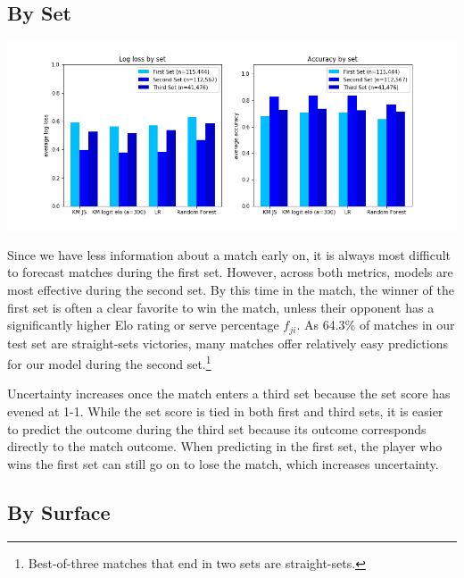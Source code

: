 \documentclass[chapterprefix=false]{report}
\begin{document}
\subsection{By Set}


\hspace*{-1.5cm}\includegraphics[scale=.6]{set_performance3}

Since we have less information about a match early on, it is always most difficult to forecast matches during the first set. However, across both metrics, models are most effective during the second set. By this time in the match, the winner of the first set is often a clear favorite to win the match, unless their opponent has a significantly higher Elo rating or serve percentage $f_{ji}$. As 64.3\% of matches in our test set are straight-sets victories, many matches offer relatively easy predictions for our model during the second set.\footnote{Best-of-three matches that end in two sets are straight-sets.}

Uncertainty increases once the match enters a third set because the set score has evened at 1-1. While the set score is tied in both first and third sets, it is easier to predict the outcome during the third set because its outcome corresponds directly to the match outcome. When predicting in the first set, the player who wins the first set can still go on to lose the match, which increases uncertainty.


\subsection{By Surface}
\end{document}
